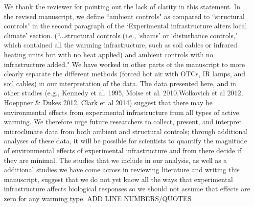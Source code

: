 \documentclass[11pt,a4paper]{letter}
\begin{document}
\begin{letter}{}
\par We thank the reviewer for pointing out the lack of clarity in this statement. In the revised manuscript, we define ``ambient controls" as compared to ``structural controls" in the second paragraph of the `Experimental infrastructure alters local climate' section. (``...structural controls (i.e., `shams' or `disturbance controls,' which contained all the warming infrastructure, such as soil cables or infrared heating units but with no heat applied) and ambient controls with no infrastructure added." We have worked in other parts of the manuscript to more clearly separate the different methods (forced hot air with OTCs, IR lamps, and soil cables) in our interpretation of the data. The data presented here, and in other studies (e.g., Kennedy et al. 1995, Moise et al.  2010,Wolkovich et al 2012, Hoeppner & Dukes 2012, Clark et al 2014) suggest that there may be environmental effects from experimental infrastructure from all types of active warming. We therefore urge future researchers to collect, present, and interpret microclimate data from both ambient and structural controls; through additional analyses of these data, it will be possible for scientists to quantify the magnitude of environmental effects of experimental infrastructure and from there decide if they are minimal. The studies that we include in our analysis, as well as a additional studies we have come across in reviewing literature and writing this manuscript, suggest that we do not yet know all the ways that experimental infrastructure affects biological responses so we should not assume that effects are zero for any warming type. ADD LINE NUMBERS/QUOTES
\\

\end{letter}
\end{document}
